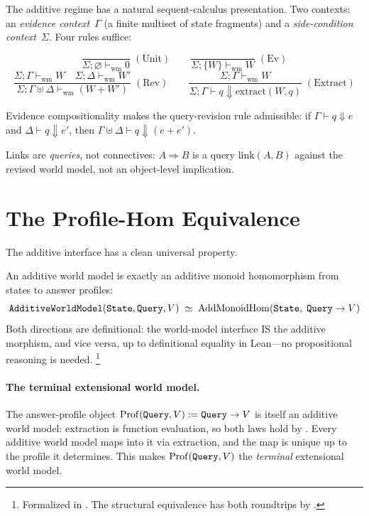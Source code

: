 \documentclass[11pt,openany]{report}
\begin{document}
The additive regime has a natural sequent-calculus presentation.
Two contexts: an \emph{evidence context}~$\Gamma$ (a finite multiset
of state fragments) and a \emph{side-condition context}~$\Sigma$.
Four rules suffice:

\[
\frac{}{\Sigma; \varnothing \vdash_{\mathrm{wm}} 0} \;(\text{Unit})
\qquad
\frac{}{\Sigma; \{W\} \vdash_{\mathrm{wm}} W} \;(\text{Ev})
\]
\[
\frac{\Sigma; \Gamma \vdash_{\mathrm{wm}} W \quad
      \Sigma; \Delta \vdash_{\mathrm{wm}} W'}
     {\Sigma; \Gamma \uplus \Delta \vdash_{\mathrm{wm}} (W + W')}
\;(\text{Rev})
\qquad
\frac{\Sigma; \Gamma \vdash_{\mathrm{wm}} W}
     {\Sigma; \Gamma \vdash q \Downarrow \mathrm{extract}(W, q)}
\;(\text{Extract})
\]

\noindent
Evidence compositionality makes the query-revision rule admissible:
if $\Gamma \vdash q \Downarrow e$ and $\Delta \vdash q \Downarrow e'$,
then $\Gamma \uplus \Delta \vdash q \Downarrow (e + e')$.

Links are \emph{queries}, not connectives: $A \Rightarrow B$ is a
query $\mathrm{link}(A, B)$ against the revised world model, not an
object-level implication.


\section{The Profile-Hom Equivalence}
\label{sec:profile-hom}

The additive interface has a clean universal property.

\begin{theorem}
\label{thm:universal-property}
An additive world model is exactly an additive monoid homomorphism
from states to answer profiles:
\[
  \texttt{AdditiveWorldModel}(\texttt{State}, \texttt{Query}, V)
  \;\simeq\;
  \mathrm{AddMonoidHom}(\texttt{State},\; \texttt{Query} \to V)
\]
Both directions are definitional: the world-model interface IS the
additive morphism, and vice versa, up to definitional equality in
Lean---no propositional reasoning is needed.%
\footnote{Formalized in .
The structural equivalence  has both
roundtrips by .}
\end{theorem}

\paragraph{The terminal extensional world model.}
The answer-profile object $\mathrm{Prof}(\texttt{Query}, V) :=
\texttt{Query} \to V$ is itself an additive world model: extraction is
function evaluation, so both laws hold by .  Every additive
world model maps into it via extraction, and the map is unique up to
the profile it determines.  This makes $\mathrm{Prof}(\texttt{Query}, V)$
the \emph{terminal} extensional world model.
\end{document}
